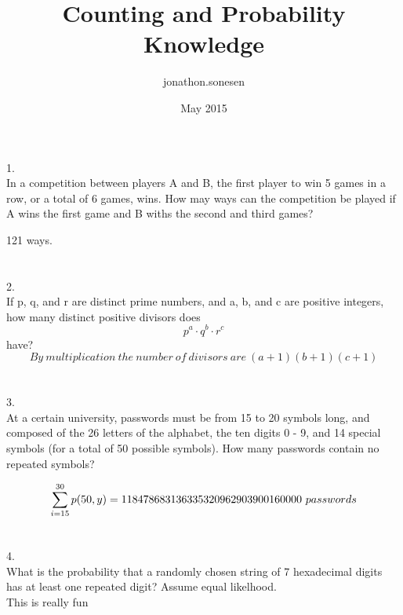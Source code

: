 \documentclass[fleqn]{article}
\title{Counting and Probability Knowledge}
\author{jonathon.sonesen }
\date{May 2015}
\begin{document}
\maketitle
\section*{}

1.  \\
In a competition between players A and B, the first player to win 5 games
in a row, or a total of 6 games, wins. How may ways can the competition be
played if A wins the first game and B withs the second and third games?

121 ways.

\section*{}
2.\\
If p, q, and r are distinct prime numbers, and a, b, and c are positive integers,
how many distinct positive divisors does 
\begin{equation*}p^a \cdot q^b \cdot r^c \end{equation*} have?
\begin{equation*}
  By~multiplication~the~number~of~divisors~are~(a+1)(b+1)(c+1)
\end{equation*}

\section*{}
3.\\
At a certain university, passwords must be from 15 to 20 symbols long, and
composed of the 26 letters of the alphabet, the ten digits 0 - 9, and 14 special
symbols (for a total of 50 possible symbols). How many passwords contain
no repeated symbols?

\begin{equation*}
  \sum \limits_{i=15}^{30}p(50,y)
  = 118478683136335320962903900160000~passwords\\
\end{equation*}

 
\section*{}
4.\\
What is the probability that a randomly chosen string of 7 hexadecimal digits 
has at least one repeated digit? Assume equal likelhood.\\
This is really fun
\end{document}
